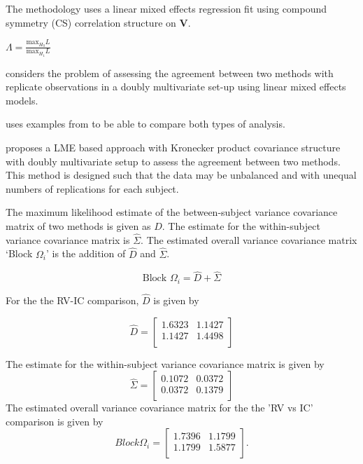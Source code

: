 \documentclass[12pt, a4paper]{report}
\theoremstyle{plain}
\theoremstyle{definition}
\theoremstyle{remark}
\begin{document}
The methodology uses a linear mixed effects regression fit using
compound symmetry (CS) correlation structure on \textbf{V}.


$\Lambda = \frac{\mbox{max}_{H_{0}}L}{\mbox{max}_{H_{1}}L}$



\citet{ARoy2009} considers the problem of assessing the agreement
between two methods with replicate observations in a doubly
multivariate set-up using linear mixed effects models.

\citet{ARoy2009} uses examples from \citet{BA86} to be able to
compare both types of analysis.

\citet{ARoy2009} proposes a LME based approach with Kronecker
product covariance structure with doubly multivariate setup to
assess the agreement between two methods. This method is designed
such that the data may be unbalanced and with unequal numbers of
replications for each subject.

The maximum likelihood estimate of the between-subject variance
covariance matrix of two methods is given as $D$. The estimate for
the within-subject variance covariance matrix is $\hat{\Sigma}$.
The estimated overall variance covariance matrix `Block
$\Omega_{i}$' is the addition of $\hat{D}$ and $\hat{\Sigma}$.


\begin{equation}
\mbox{Block  }\Omega_{i} = \hat{D} + \hat{\Sigma}
\end{equation}

For the the RV-IC comparison, $\hat{D}$ is given by


\begin{equation}
\hat{D}= \left[ \begin{array}{cc}
1.6323 & 1.1427  \\
1.1427 & 1.4498 \\
\end{array} \right]
\end{equation}

The estimate for the within-subject variance covariance matrix is
given by
\begin{equation}
\hat{\Sigma}= \left[ \begin{array}{cc}
0.1072 & 0.0372  \\
0.0372 & 0.1379  \\
\end{array}\right]
\end{equation}
The estimated overall variance covariance matrix for the the 'RV
vs IC' comparison is given by
\begin{equation}
Block \Omega_{i}= \left[ \begin{array}{cc}
1.7396 & 1.1799  \\
1.1799 & 1.5877  \\
\end{array} \right].
\end{equation}
\end{document}
